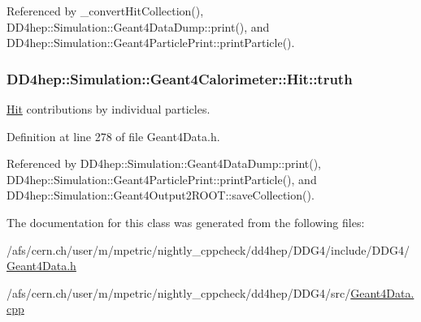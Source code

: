Referenced by \_\-convertHitCollection(), DD4hep::Simulation::Geant4DataDump::print(), and DD4hep::Simulation::Geant4ParticlePrint::printParticle().\hypertarget{class_d_d4hep_1_1_simulation_1_1_geant4_calorimeter_1_1_hit_a7e22969405a034dc2f0deb3df1606d0d}{
\subsubsection[{truth}]{ {\bf DD4hep::Simulation::Geant4Calorimeter::Hit::truth}}}
\label{class_d_d4hep_1_1_simulation_1_1_geant4_calorimeter_1_1_hit_a7e22969405a034dc2f0deb3df1606d0d}


\hyperlink{class_d_d4hep_1_1_simulation_1_1_geant4_calorimeter_1_1_hit}{Hit} contributions by individual particles. 

Definition at line 278 of file Geant4Data.h.

Referenced by DD4hep::Simulation::Geant4DataDump::print(), DD4hep::Simulation::Geant4ParticlePrint::printParticle(), and DD4hep::Simulation::Geant4Output2ROOT::saveCollection().

The documentation for this class was generated from the following files:\begin{DoxyCompactItemize}
\item 
/afs/cern.ch/user/m/mpetric/nightly\_\-cppcheck/dd4hep/DDG4/include/DDG4/\hyperlink{_geant4_data_8h}{Geant4Data.h}\item 
/afs/cern.ch/user/m/mpetric/nightly\_\-cppcheck/dd4hep/DDG4/src/\hyperlink{_geant4_data_8cpp}{Geant4Data.cpp}\end{DoxyCompactItemize}
